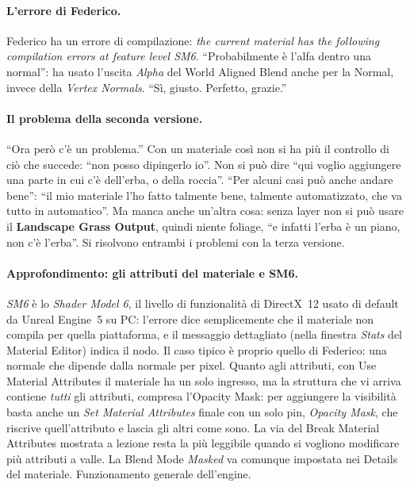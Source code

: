\paragraph{L'errore di Federico.} Federico ha un errore di compilazione: \emph{the current
material has the following compilation errors at feature level SM6}. ``Probabilmente è
l'alfa dentro una normal'': ha usato l'uscita \emph{Alpha} del World Aligned Blend anche
per la Normal, invece della \emph{Vertex Normals}. ``Sì, giusto. Perfetto, grazie.''

\paragraph{Il problema della seconda versione.} ``Ora però c'è un problema.'' Con un materiale
così non si ha più il controllo di ciò che succede: ``non posso dipingerlo io''. Non si può
dire ``qui voglio aggiungere una parte in cui c'è dell'erba, o della roccia''. ``Per alcuni
casi può anche andare bene'': ``il mio materiale l'ho fatto talmente bene, talmente
automatizzato, che va tutto in automatico''. Ma manca anche un'altra cosa: senza layer non si
può usare il \textbf{Landscape Grass Output}, quindi niente foliage, ``e infatti l'erba è un
piano, non c'è l'erba''. Si risolvono entrambi i problemi con la terza versione.

\paragraph{Approfondimento: gli attributi del materiale e SM6.} \emph{SM6} è lo \emph{Shader
Model 6}, il livello di funzionalità di DirectX~12 usato di default da Unreal Engine~5 su
PC: l'errore dice semplicemente che il materiale non compila per quella piattaforma, e il
messaggio dettagliato (nella finestra \emph{Stats} del Material Editor) indica il nodo. Il
caso tipico è proprio quello di Federico: una normale che dipende dalla normale per pixel.
Quanto agli attributi, con Use Material Attributes il materiale ha un solo ingresso, ma la
struttura che vi arriva contiene \emph{tutti} gli attributi, compresa l'Opacity Mask: per
aggiungere la visibilità basta anche un \emph{Set Material Attributes} finale con un solo
pin, \emph{Opacity Mask}, che riscrive quell'attributo e lascia gli altri come sono. La via
del Break Material Attributes mostrata a lezione resta la più leggibile quando si vogliono
modificare più attributi a valle. La Blend Mode \emph{Masked} va comunque impostata nei
Details del materiale. Funzionamento generale dell'engine.

